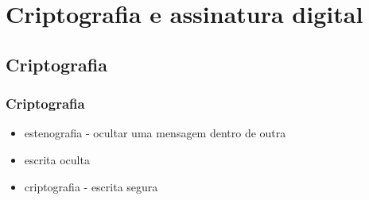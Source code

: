 \section{Criptografia e assinatura digital}

\subsection{Criptografia}
\begin{frame}
\frametitle{Criptografia}

\begin{itemize}
\item estenografia - ocultar uma mensagem dentro de outra
\item escrita oculta
\item criptografia - escrita segura
\end{itemize}

\end{frame}



